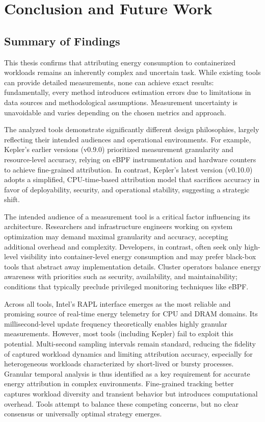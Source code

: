 \chapter{Conclusion and Future Work}
\label{Chapter5}

\section{Summary of Findings}

This thesis confirms that attributing energy consumption to containerized workloads remains an inherently complex and uncertain task. While existing tools can provide detailed measurements, none can achieve exact results: fundamentally, every method introduces estimation errors due to limitations in data sources and methodological assumptions. Measurement uncertainty is unavoidable and varies depending on the chosen metrics and approach.

The analyzed tools demonstrate significantly different design philosophies, largely reflecting their intended audiences and operational environments. For example, Kepler’s earlier versions (v0.9.0) prioritized measurement granularity and resource-level accuracy, relying on eBPF instrumentation and hardware counters to achieve fine-grained attribution. In contrast, Kepler’s latest version (v0.10.0) adopts a simplified, CPU-time-based attribution model that sacrifices accuracy in favor of deployability, security, and operational stability, suggesting a strategic shift.

The intended audience of a measurement tool is a critical factor influencing its architecture. Researchers and infrastructure engineers working on system optimization may demand maximal granularity and accuracy, accepting additional overhead and complexity. Developers, in contrast, often seek only high-level visibility into container-level energy consumption and may prefer black-box tools that abstract away implementation details. Cluster operators balance energy awareness with priorities such as security, availability, and maintainability; conditions that typically preclude privileged monitoring techniques like eBPF.

Across all tools, Intel’s RAPL interface emerges as the most reliable and promising source of real-time energy telemetry for CPU and DRAM domains. Its millisecond-level update frequency theoretically enables highly granular measurements. However, most tools (including Kepler) fail to exploit this potential. Multi-second sampling intervals remain standard, reducing the fidelity of captured workload dynamics and limiting attribution accuracy, especially for heterogeneous workloads characterized by short-lived or bursty processes. Granular temporal analysis is thus identified as a key requirement for accurate energy attribution in complex environments. Fine-grained tracking better captures workload diversity and transient behavior but introduces computational overhead. Tools attempt to balance these competing concerns, but no clear consensus or universally optimal strategy emerges.

